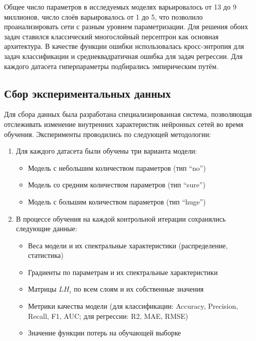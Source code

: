 \documentclass[a4paper,12pt]{article}
\begin{document}
Общее число параметров в исследуемых моделях варьировалось от 13 до 9 миллионов, число слоёв варьировалось от
1 до 5, что позволило проанализировать сети с
разным уровнем параметризации. Для решения обоих задач ставился классический многослойный персептрон как
основная архитектура.
В качестве функции ошибки использовалась кросс-энтропия для задач классификации и среднеквадратичная ошибка
для задач регрессии.
Для каждого датасета гиперпараметры подбирались эмпирическим путём.

\subsection{Сбор экспериментальных данных}

Для сбора данных была разработана специализированная система, позволяющая отслеживать изменение внутренних
характеристик нейронных сетей во время обучения. Эксперименты проводились по следующей методологии:

\begin{enumerate}
  \item Для каждого датасета были обучены три варианта модели:
    \begin{itemize}
      \item Модель с небольшим количеством параметров (тип ``no'')
      \item Модель со средним количеством параметров (тип ``sure'')
      \item Модель с большим количеством параметров (тип ``huge'')
    \end{itemize}

  \item В процессе обучения на каждой контрольной итерации сохранялись следующие данные:
    \begin{itemize}
      \item Веса модели и их спектральные характеристики (распределение, статистика)
      \item Градиенты по параметрам и их спектральные характеристики
      \item Матрицы $LH_i$ по всем слоям и их собственные значения
      \item Метрики качества модели (для классификации: Accuracy, Precision, Recall, F1, AUC; для регрессии:
        R2, MAE, RMSE)
      \item Значение функции потерь на обучающей выборке
    \end{itemize}
\end{enumerate}
\end{document}
